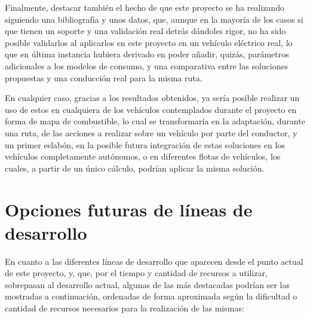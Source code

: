 \documentclass[11pt,spanish,listoffigures,listoftables]{tfgetsinf}
\begin{document}
Finalmente, destacar también el hecho de que este proyecto se ha realizando siguiendo una bibliografía y unos datos, que, aunque en la mayoría de los casos si que tienen un soporte y una validación real detrás dándoles rigor, no ha sido posible validarlos al aplicarlos en este proyecto en un vehículo eléctrico real, lo que en última instancia hubiera derivado en poder añadir, quizás, parámetros adicionales a los modelos de consumo, y una comparativa entre las soluciones propuestas y una conducción real para la misma ruta.

En cualquier caso, gracias a los resultados obtenidos, ya sería posible realizar un uso de estos en cualquiera de los vehículos contemplados durante el proyecto en forma de mapa de combustible, lo cual se transformaría en la adaptación, durante una ruta, de las acciones a realizar sobre un vehículo por parte del conductor, y un primer eslabón, en la posible futura integración de estas soluciones en los vehículos completamente autónomos, o en diferentes flotas de vehículos, los cuales, a partir de un único cálculo, podrían aplicar la misma solución.

\section{Opciones futuras de líneas de desarrollo}
En cuanto a las diferentes líneas de desarrollo que aparecen desde el punto actual de este proyecto, y, que, por el tiempo y cantidad de recursos a utilizar, sobrepasan al desarrollo actual, algunas de las más destacadas podrían ser las mostradas a continuación, ordenadas de forma aproximada según la dificultad o cantidad de recursos necesarios para la realización de las mismas:
\end{document}
